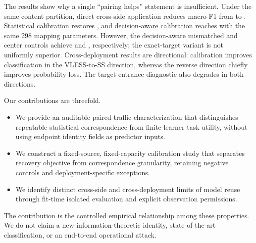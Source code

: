 The results show why a single ``pairing helps'' statement is insufficient. Under the same content partition, direct cross-side application reduces macro-F1 from \FOneA{} to \FOneB{}. Statistical calibration restores \FOneC{}, and decision-aware calibration reaches \FOneF{} with the same 298 mapping parameters. However, the decision-aware mismatched and center controls achieve \FOneG{} and \FOneH{}, respectively; the exact-target variant is not uniformly superior. Cross-deployment results are directional: calibration improves classification in the VLESS-to-SS direction, whereas the reverse direction chiefly improves probability loss. The target-entrance diagnostic also degrades in both directions.

Our contributions are threefold.
\begin{itemize}
\item We provide an auditable paired-traffic characterization that distinguishes repeatable statistical correspondence from finite-learner task utility, without using endpoint identity fields as predictor inputs.
\item We construct a fixed-source, fixed-capacity calibration study that separates recovery objective from correspondence granularity, retaining negative controls and deployment-specific exceptions.
\item We identify distinct cross-side and cross-deployment limits of model reuse through fit-time isolated evaluation and explicit observation permissions.
\end{itemize}
The contribution is the controlled empirical relationship among these properties. We do not claim a new information-theoretic identity, state-of-the-art classification, or an end-to-end operational attack.
